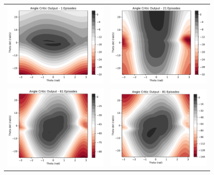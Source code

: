 \begin{figure}[H]
	\begin{tabular}{cc}
		\includegraphics[width=65mm]{figures/train_figs/angle_critic/Critic0_1.pdf} &  
		\includegraphics[width=65mm]{figures/train_figs/angle_critic/Critic0_21.pdf} \\
		\includegraphics[width=65mm]{figures/train_figs/angle_critic/Critic0_61.pdf} &   \includegraphics[width=65mm]{figures/train_figs/angle_critic/Critic0_81.pdf} \\

\end{tabular}
\end{figure}
